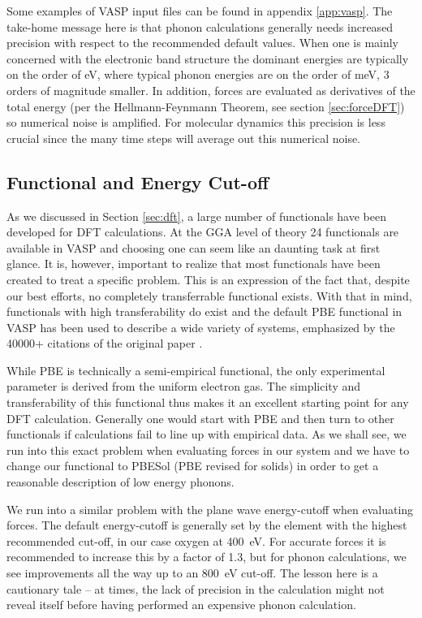 \noindent Some examples of VASP input files can be found in appendix \ref{app:vasp}. The take-home message here is that phonon calculations generally needs increased precision with respect to the recommended default values. When one is mainly concerned with the electronic band structure the dominant energies are typically on the order of eV, where typical phonon energies are on the order of meV, 3 orders of magnitude smaller. In addition, forces are evaluated as derivatives of the total energy (per the Hellmann-Feynmann Theorem, see section \ref{sec:forceDFT}) so numerical noise is amplified. For molecular dynamics this precision is less crucial since the many time steps will average out this numerical noise.

\subsection{Functional and Energy Cut-off}
As we discussed in Section \ref{sec:dft}, a large number of functionals have been developed for DFT calculations. At the GGA level of theory 24 functionals are available in VASP and choosing one can seem like an daunting task at first glance. It is, however, important to realize that most functionals have been created to treat a specific problem. This is an expression of the fact that, despite our best efforts, no completely transferrable functional exists. With that in mind, functionals with high transferability do exist and the default PBE functional in VASP has been used to describe a wide variety of systems, emphasized by the 40000+ citations of the original paper \cite{Perdew1996}. 

While PBE is technically a semi-empirical functional, the only experimental parameter is derived from the uniform electron gas. The simplicity and transferability of this functional thus makes it an excellent starting point for any DFT calculation. Generally one would start with PBE and then turn to other functionals if calculations fail to line up with empirical data. As we shall see, we run into this exact problem when evaluating forces in our system and we have to change our functional to PBESol (PBE revised for solids) in order to get a reasonable description of low energy phonons. 

We run into a similar problem with the plane wave energy-cutoff when evaluating forces. The default energy-cutoff is generally set by the element with the highest recommended cut-off, in our case oxygen at \SI{400}{\eV}. For accurate forces it is recommended to increase this by a factor of 1.3, but for phonon calculations, we see improvements all the way up to an \SI{800}{\eV} cut-off. The lesson here is a cautionary tale -- at times, the lack of precision in the calculation might not reveal itself before having performed an expensive phonon calculation.

